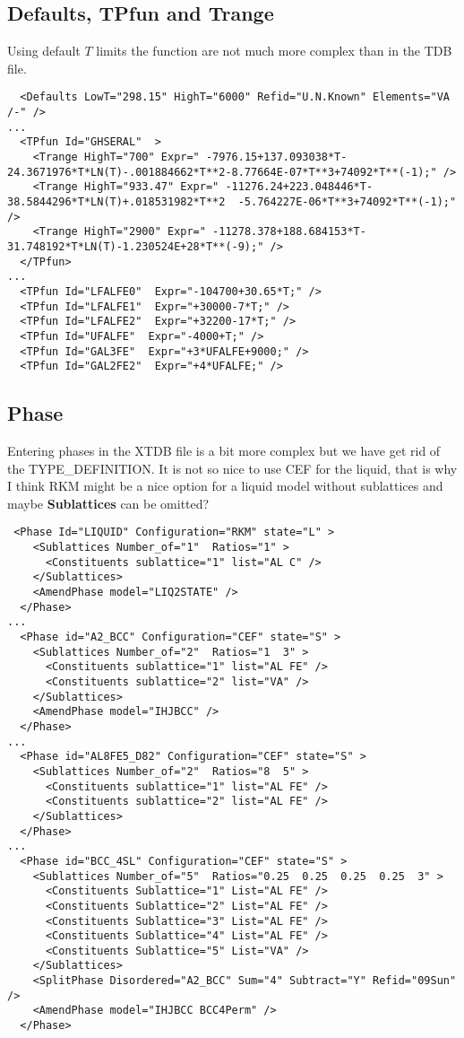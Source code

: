 \documentclass{article}
\begin{document}
\begin{appendices}
\subsection{Defaults, TPfun and Trange}

Using default $T$ limits the function are not much more complex than
in the TDB file.

{\small
\begin{verbatim}
  <Defaults LowT="298.15" HighT="6000" Refid="U.N.Known" Elements="VA /-" />
...
  <TPfun Id="GHSERAL"  >
    <Trange HighT="700" Expr=" -7976.15+137.093038*T-24.3671976*T*LN(T)-.001884662*T**2-8.77664E-07*T**3+74092*T**(-1);" />
    <Trange HighT="933.47" Expr=" -11276.24+223.048446*T-38.5844296*T*LN(T)+.018531982*T**2  -5.764227E-06*T**3+74092*T**(-1);" />
    <Trange HighT="2900" Expr=" -11278.378+188.684153*T-31.748192*T*LN(T)-1.230524E+28*T**(-9);" />
  </TPfun>
...
  <TPfun Id="LFALFE0"  Expr="-104700+30.65*T;" />
  <TPfun Id="LFALFE1"  Expr="+30000-7*T;" />
  <TPfun Id="LFALFE2"  Expr="+32200-17*T;" />
  <TPfun Id="UFALFE"  Expr="-4000+T;" />
  <TPfun Id="GAL3FE"  Expr="+3*UFALFE+9000;" />
  <TPfun Id="GAL2FE2"  Expr="+4*UFALFE;" />
\end{verbatim}
}

\subsection{Phase}\label{sec:phase example}

Entering phases in the XTDB file is a bit more complex but we have get
rid of the TYPE\_DEFINITION.  It is not so nice to use CEF for the
liquid, that is why I think RKM might be a nice option for a liquid
model without sublattices and maybe {\bf Sublattices} can be omitted?

{\small
\begin{verbatim}
 <Phase Id="LIQUID" Configuration="RKM" state="L" >
    <Sublattices Number_of="1"  Ratios="1" >
      <Constituents sublattice="1" list="AL C" />
    </Sublattices>
    <AmendPhase model="LIQ2STATE" />
  </Phase>
...
  <Phase id="A2_BCC" Configuration="CEF" state="S" >
    <Sublattices Number_of="2"  Ratios="1  3" >
      <Constituents sublattice="1" list="AL FE" />
      <Constituents sublattice="2" list="VA" />
    </Sublattices>
    <AmendPhase model="IHJBCC" />
  </Phase>
...
  <Phase id="AL8FE5_D82" Configuration="CEF" state="S" >
    <Sublattices Number_of="2"  Ratios="8  5" >
      <Constituents sublattice="1" list="AL FE" />
      <Constituents sublattice="2" list="AL FE" />
    </Sublattices>
  </Phase>
...
  <Phase id="BCC_4SL" Configuration="CEF" state="S" >
    <Sublattices Number_of="5"  Ratios="0.25  0.25  0.25  0.25  3" >
      <Constituents Sublattice="1" List="AL FE" />
      <Constituents Sublattice="2" List="AL FE" />
      <Constituents Sublattice="3" List="AL FE" />
      <Constituents Sublattice="4" List="AL FE" />
      <Constituents Sublattice="5" List="VA" />
    </Sublattices>
    <SplitPhase Disordered="A2_BCC" Sum="4" Subtract="Y" Refid="09Sun" />
    <AmendPhase model="IHJBCC BCC4Perm" />
  </Phase>


\end{verbatim}}
\end{appendices}
\end{document}
